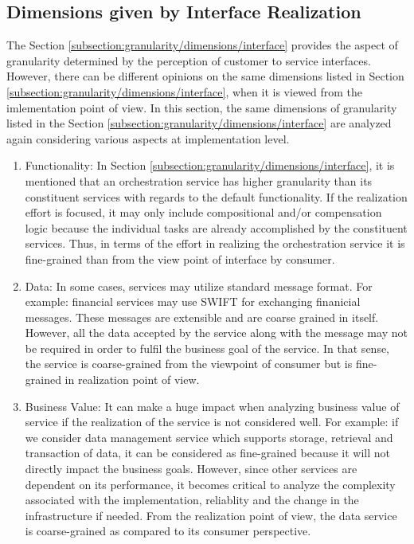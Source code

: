 \subsection{Dimensions given by Interface Realization}\label{subsection:granularity/dimensions/interface_realization}
The Section \ref{subsection:granularity/dimensions/interface} provides the aspect of granularity determined by the perception of customer to service interfaces. However, there can be different opinions on the same dimensions listed in Section \ref{subsection:granularity/dimensions/interface}, when it is viewed from the imlementation point of view. In this section, the same dimensions of granularity listed in the Section \ref{subsection:granularity/dimensions/interface} are analyzed again considering various aspects at implementation level.
\begin{enumerate}
\item Functionality: In Section \ref{subsection:granularity/dimensions/interface}, it is mentioned that an orchestration service has higher granularity than its constituent services with regards to the default functionality. If the realization effort is focused, it may only include compositional and/or compensation logic because the individual tasks are already accomplished by the constituent services. Thus, in terms of the effort in realizing the orchestration service it is fine-grained than from the view point of interface by consumer. \cite{Raf-Haesen:2015aa}
\\
\item Data: In some cases, services may utilize standard message format. For example: financial services may use \acrshort{SWIFT} for exchanging finanicial messages. These messages are extensible and are coarse grained in itself. However, all the data accepted by the service along with the message may not be required in order to fulfil the business goal of the service. In that sense, the service is coarse-grained from the viewpoint of consumer but is fine-grained in realization point of view. \cite{Raf-Haesen:2015aa}
\\
\item Business Value: It can make a huge impact when analyzing business value of service if the realization of the service is not considered well. For example: if we consider data management service which supports storage, retrieval and transaction of data, it can be considered as fine-grained because it will not directly impact the business goals. However, since other services are dependent on its performance, it becomes critical to analyze the complexity associated with the implementation, reliablity and the change in the infrastructure if needed. From the realization point of view, the data service is coarse-grained as compared to its consumer perspective. \cite{Raf-Haesen:2015aa}
\end{enumerate}

